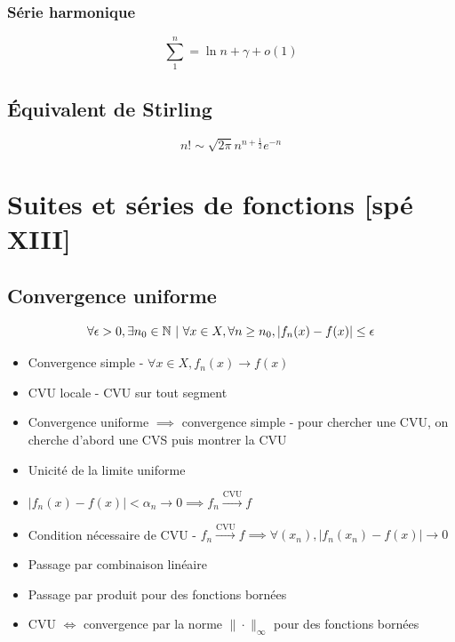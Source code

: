 \documentclass[openany]{book}
\begin{document}
\subsubsection{Série harmonique}

\[ \sum_{1}^n = \ln n + \gamma +o(1) \]

\subsection{Équivalent de Stirling}

\[ n! \sim \sqrt{2 \pi} n^{n+\frac{1}{2}}e^{-n} \]

\clearpage

\section{Suites et séries de fonctions [spé XIII]}

\subsection{Convergence uniforme}

\[ \forall \epsilon > 0, \exists n_0 \in \mathbb{N} \text{ } | \text{ } \forall x \in X, \forall n \geq n_0, |f_n(x) - f(x)| \leq \epsilon \]

\begin{itemize}
    \item Convergence simple - $\forall x \in X, f_n(x) \longrightarrow f(x)$
    \item CVU locale - CVU sur tout segment
    \item Convergence uniforme $\implies$ convergence simple - pour chercher une CVU, on cherche d'abord une CVS puis montrer la CVU
    \item Unicité de la limite uniforme
    \item $|f_n(x) - f(x)| < \alpha_n \longrightarrow 0 \implies f_n \overset{\text{CVU}}{\longrightarrow} f$
    \item Condition nécessaire de CVU - $f_n \overset{\text{CVU}}{\longrightarrow} f \implies \forall (x_n), |f_n(x_n) - f(x)| \longrightarrow 0$ 
    \item Passage par combinaison linéaire
    \item Passage par produit pour des fonctions bornées
    \item CVU $\iff$ convergence par la norme $\|\cdot\|_\infty$ pour des fonctions bornées
\end{itemize}
\end{document}
